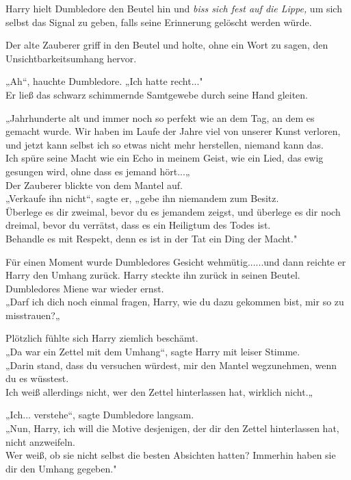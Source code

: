 {Harry hielt Dumbledore den Beutel hin und \emph{biss sich fest auf die Lippe,} um sich selbst das Signal zu geben, falls seine Erinnerung gelöscht werden würde.

Der alte Zauberer griff in den Beutel und holte, ohne ein Wort zu sagen, den Unsichtbarkeitsumhang hervor.

„Ah“, hauchte Dumbledore. „Ich hatte recht..."\\ Er ließ das schwarz schimmernde Samtgewebe durch seine Hand gleiten.

„Jahrhunderte alt und immer noch so perfekt wie an dem Tag, an dem es gemacht wurde. Wir haben im Laufe der Jahre viel von unserer Kunst verloren, und jetzt kann selbst ich so etwas nicht mehr herstellen, niemand kann das.\\ Ich spüre seine Macht wie ein Echo in meinem Geist, wie ein Lied, das ewig gesungen wird, ohne dass es jemand hört...„\\ Der Zauberer blickte von dem Mantel auf.\\ „Verkaufe ihn nicht“, sagte er, „gebe ihn niemandem zum Besitz.\\ Überlege es dir zweimal, bevor du es jemandem zeigst, und überlege es dir noch dreimal, bevor du verrätst, dass es ein Heiligtum des Todes ist.\\ Behandle es mit Respekt, denn es ist in der Tat ein Ding der Macht."

Für einen Moment wurde Dumbledores Gesicht wehmütig......und dann reichte er Harry den Umhang zurück. Harry steckte ihn zurück in seinen Beutel. Dumbledores Miene war wieder ernst.\\ „Darf ich dich noch einmal fragen, Harry, wie du dazu gekommen bist, mir so zu misstrauen?„

Plötzlich fühlte sich Harry ziemlich beschämt.\\ „Da war ein Zettel mit dem Umhang“, sagte Harry mit leiser Stimme.\\ „Darin stand, dass du versuchen würdest, mir den Mantel wegzunehmen, wenn du es wüsstest.\\ Ich weiß allerdings nicht, wer den Zettel hinterlassen hat, wirklich nicht.„

„Ich... verstehe“, sagte Dumbledore langsam.\\ „Nun, Harry, ich will die Motive desjenigen, der dir den Zettel hinterlassen hat, nicht anzweifeln.\\ Wer weiß, ob sie nicht selbst die besten Absichten hatten? Immerhin haben sie dir den Umhang gegeben."

}
